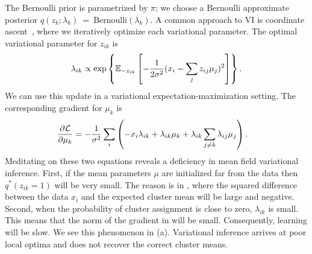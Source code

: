 The Bernoulli prior is parametrized by $\pi$; we choose a Bernoulli approximate posterior $q(z_k;\lambda_k)~=~\textrm{Bernoulli}(\lambda_{k})$.  A common approach to \gls{VI} is coordinate ascent~\citep{bishop2006pattern}, where we iteratively optimize each variational parameter.  The optimal variational parameter for $z_{ik}$ is
\begin{align}
  \label{eq:z_update} \lambda_{ik} \propto
   \exp \left\{\mathbb{E}_{-z_{ik}} \left[- \frac{1}{2\sigma^2}(x_i -
    \sum_{j} z_{ij} \mu_j)^2\right]\right\}.
\end{align}
We can use this update in a variational expectation-maximization setting.  The
corresponding gradient for $\mu_k$ is
\begin{align}
  \label{eq:mu-gradient}
  \frac{\partial \mathcal{L}}{\partial\mu_k}
  &= -
    \frac{1}{\sigma^2}\sum_i
    \left(-x_i \lambda_{ik} + \lambda_{ik} \mu_k
    + \lambda_{ik} \sum_{j \neq k}\lambda_{ij}\mu_j\right).
\end{align}
Meditating on these two equations reveals a deficiency in mean field variational inference.  First, if the mean parameters $\mu$ are initialized far from the data then $q^*(z_{ik} = 1)$ will be very small.  The reason is in , where the squared difference between the data $x_i$ and the expected cluster mean will be large and negative.  Second, when the probability of cluster assignment is close to zero, $\lambda_{ik}$ is small.  This means that the norm of the gradient in  will be small. Consequently, learning will be slow. We see this phenomenon in  (a). Variational inference arrives at poor local optima and does not recover the correct cluster means.